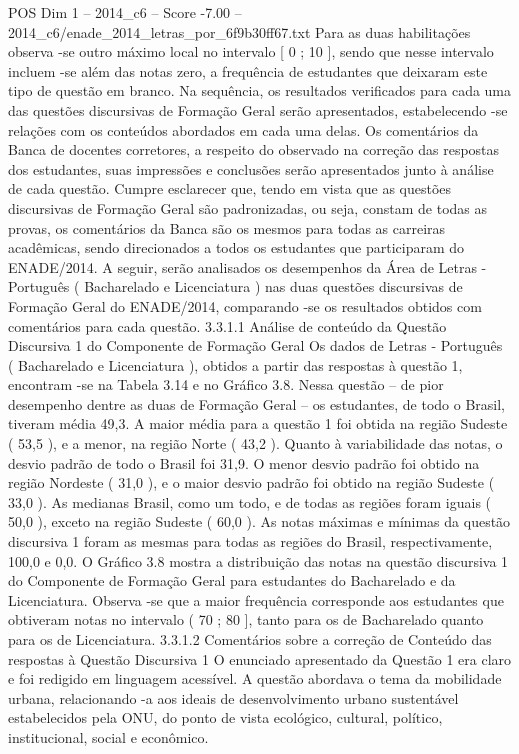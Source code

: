\begin{textsample}{POS Dim 1 – 2014\_c6 – Score -7.00 – 2014\_c6/enade\_2014\_letras\_por\_6f9b30ff67.txt}
Para as duas habilitações observa -se outro máximo local no intervalo [ 0 ; 10 ], sendo que nesse intervalo incluem -se além das notas zero, a frequência de estudantes que deixaram este tipo de questão em branco.
Na sequência, os resultados verificados para cada uma das questões discursivas de Formação Geral serão apresentados, estabelecendo -se relações com os conteúdos abordados em cada uma delas.
Os comentários da Banca de docentes corretores, a respeito do observado na correção das respostas dos estudantes, suas impressões e conclusões serão apresentados junto à análise de cada questão.
Cumpre esclarecer que, tendo em vista que as questões discursivas de Formação Geral são padronizadas, ou seja, constam de todas as provas, os comentários da Banca são os mesmos para todas as carreiras acadêmicas, sendo direcionados a todos os estudantes que participaram do ENADE/2014.
A seguir, serão analisados os desempenhos da Área de Letras - Português ( Bacharelado e Licenciatura ) nas duas questões discursivas de Formação Geral do ENADE/2014, comparando -se os resultados obtidos com comentários para cada questão. 3.3.1.1 Análise de conteúdo da Questão Discursiva 1 do Componente de Formação Geral Os dados de Letras - Português ( Bacharelado e Licenciatura ), obtidos a partir das respostas à questão 1, encontram -se na Tabela 3.14 e no Gráfico 3.8.
Nessa questão – de pior desempenho dentre as duas de Formação Geral – os estudantes, de todo o Brasil, tiveram média 49,3.
A maior média para a questão 1 foi obtida na região Sudeste ( 53,5 ), e a menor, na região Norte ( 43,2 ).
Quanto à variabilidade das notas, o desvio padrão de todo o Brasil foi 31,9.
O menor desvio padrão foi obtido na região Nordeste ( 31,0 ), e o maior desvio padrão foi obtido na região Sudeste ( 33,0 ).
As medianas Brasil, como um todo, e de todas as regiões foram iguais ( 50,0 ), exceto na região Sudeste ( 60,0 ).
As notas máximas e mínimas da questão discursiva 1 foram as mesmas para todas as regiões do Brasil, respectivamente, 100,0 e 0,0.
O Gráfico 3.8 mostra a distribuição das notas na questão discursiva 1 do Componente de Formação Geral para estudantes do Bacharelado e da Licenciatura.
Observa -se que a maior frequência corresponde aos estudantes que obtiveram notas no intervalo ( 70 ; 80 ], tanto para os de Bacharelado quanto para os de Licenciatura. 3.3.1.2 Comentários sobre a correção de Conteúdo das respostas à Questão Discursiva 1 O enunciado apresentado da Questão 1 era claro e foi redigido em linguagem acessível.
A questão abordava o tema da mobilidade urbana, relacionando -a aos ideais de desenvolvimento urbano sustentável estabelecidos pela ONU, do ponto de vista ecológico, cultural, político, institucional, social e econômico.

\end{textsample}
